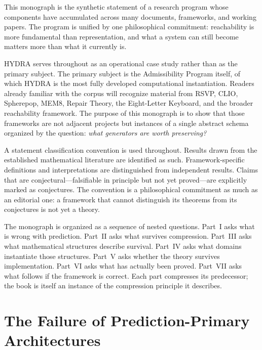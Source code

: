 \documentclass[12pt, oneside]{book}
\theoremstyle{flyxion}
\theoremstyle{definition}
\begin{document}
This monograph is the synthetic statement of a research program whose
components have accumulated across many documents, frameworks, and
working papers. The program is unified by one philosophical commitment:
reachability is more fundamental than representation, and what a system
can still become matters more than what it currently is.

HYDRA serves throughout as an operational case study rather than as the
primary subject. The primary subject is the Admissibility Program
itself, of which HYDRA is the most fully developed computational
instantiation. Readers already familiar with the corpus will recognize
material from RSVP, CLIO, Spherepop, MEM\textbar{}8, Repair Theory, the
Eight-Letter Keyboard, and the broader reachability framework. The
purpose of this monograph is to show that those frameworks are not
adjacent projects but instances of a single abstract schema organized by
the question: \emph{what generators are worth preserving?}

A statement classification convention is used throughout. Results drawn
from the established mathematical literature are identified as such.
Framework-specific definitions and interpretations are distinguished from
independent results. Claims that are conjectural---falsifiable in
principle but not yet proved---are explicitly marked as conjectures. The
convention is a philosophical commitment as much as an editorial one: a
framework that cannot distinguish its theorems from its conjectures is
not yet a theory.

The monograph is organized as a sequence of nested questions. Part~I
asks what is wrong with prediction. Part~II asks what survives
compression. Part~III asks what mathematical structures describe
survival. Part~IV asks what domains instantiate those structures.
Part~V asks whether the theory survives implementation. Part~VI asks
what has actually been proved. Part~VII asks what follows if the
framework is correct. Each part compresses its predecessor; the book is
itself an instance of the compression principle it describes.

\tableofcontents

\part{The Failure of Prediction-Primary Architectures}
\end{document}
